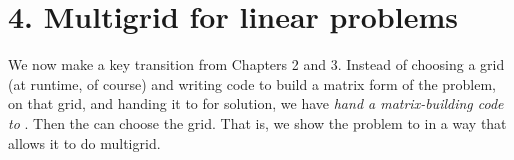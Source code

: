 
\chapter{4. Multigrid for linear problems}

We now make a key transition from Chapters 2 and 3.  Instead of choosing a grid (at runtime, of course) and writing code to build a matrix form of the problem, on that grid, and handing it to \pKSP for solution, we have \emph{hand a matrix-building code to} \pKSP.  Then the \pKSP can choose the grid.  That is, we show the problem to \PETSc in a way that allows it to do multigrid.




